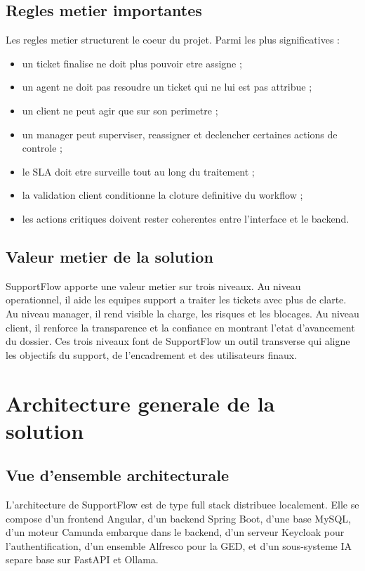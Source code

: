 \documentclass[12pt,a4paper,oneside]{report}
\begin{document}
\section{Regles metier importantes}

Les regles metier structurent le coeur du projet. Parmi les plus significatives :

\begin{itemize}[leftmargin=1.2cm]
  \item un ticket finalise ne doit plus pouvoir etre assigne ;
  \item un agent ne doit pas resoudre un ticket qui ne lui est pas attribue ;
  \item un client ne peut agir que sur son perimetre ;
  \item un manager peut superviser, reassigner et declencher certaines actions de controle ;
  \item le SLA doit etre surveille tout au long du traitement ;
  \item la validation client conditionne la cloture definitive du workflow ;
  \item les actions critiques doivent rester coherentes entre l'interface et le backend.
\end{itemize}

\section{Valeur metier de la solution}

SupportFlow apporte une valeur metier sur trois niveaux. Au niveau operationnel, il aide les equipes support a traiter les tickets avec plus de clarte. Au niveau manager, il rend visible la charge, les risques et les blocages. Au niveau client, il renforce la transparence et la confiance en montrant l'etat d'avancement du dossier. Ces trois niveaux font de SupportFlow un outil transverse qui aligne les objectifs du support, de l'encadrement et des utilisateurs finaux.

\chapter{Architecture generale de la solution}

\section{Vue d'ensemble architecturale}

L'architecture de SupportFlow est de type full stack distribuee localement. Elle se compose d'un frontend Angular, d'un backend Spring Boot, d'une base MySQL, d'un moteur Camunda embarque dans le backend, d'un serveur Keycloak pour l'authentification, d'un ensemble Alfresco pour la GED, et d'un sous-systeme IA separe base sur FastAPI et Ollama.
\end{document}
